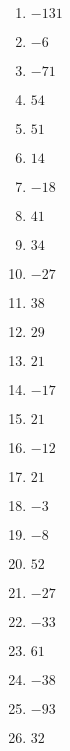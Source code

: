 \documentclass[9pt,dvipdfmx,a4paper]{article}
\begin{document}
\begin{multicols}{2}
\begin{enumerate}
\item
$ -131$

\item
$ -6$

\item
$ -71$

\item
$ 54$

\item
$ 51$

\item
$ 14$

\item
$ -18$

\item
$ 41$

\item
$ 34$

\item
$ -27$

\item
$ 38$

\item
$ 29$

\item
$ 21$

\item
$ -17$

\item
$ 21$

\item
$ -12$

\item
$ 21$

\item
$ -3$

\item
$ -8$

\item
$ 52$

\item
$ -27$

\item
$ -33$

\item
$ 61$

\item
$ -38$

\item
$ -93$

\item
$ 32$


\end{enumerate}
\end{multicols}
\end{document}
